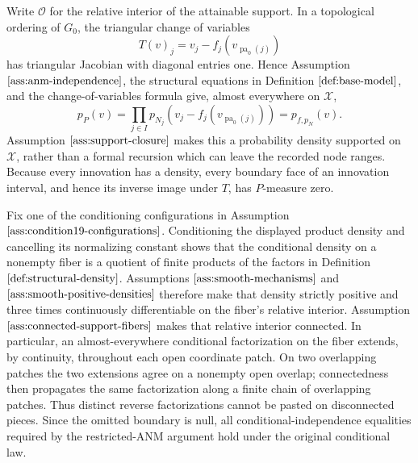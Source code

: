 Write \(\mathcal O\) for the relative interior of the attainable support.  In a topological ordering of \(G_0\), the triangular change of variables
\[
 T(v)_j=v_j-f_j(v_{\operatorname{pa}_0(j)})
\]
has triangular Jacobian with diagonal entries one.  Hence Assumption \(\ref{ass:anm-independence}\), the structural equations in Definition \(\ref{def:base-model}\), and the change-of-variables formula give, almost everywhere on \(\mathcal X\),
\[
 p_P(v)=\prod_{j\in I}p_{N_j}\!\left(v_j-f_j(v_{\operatorname{pa}_0(j)})\right)
 =p_{f,p_N}(v).
\]
Assumption \(\ref{ass:support-closure}\) makes this a probability density supported on \(\mathcal X\), rather than a formal recursion which can leave the recorded node ranges.  Because every innovation has a density, every boundary face of an innovation interval, and hence its inverse image under \(T\), has \(P\)-measure zero.

Fix one of the conditioning configurations in Assumption \(\ref{ass:condition19-configurations}\).  Conditioning the displayed product density and cancelling its normalizing constant shows that the conditional density on a nonempty fiber is a quotient of finite products of the factors in Definition \(\ref{def:structural-density}\).  Assumptions \(\ref{ass:smooth-mechanisms}\) and \(\ref{ass:smooth-positive-densities}\) therefore make that density strictly positive and three times continuously differentiable on the fiber's relative interior.  Assumption \(\ref{ass:connected-support-fibers}\) makes that relative interior connected.  In particular, an almost-everywhere conditional factorization on the fiber extends, by continuity, throughout each open coordinate patch.  On two overlapping patches the two extensions agree on a nonempty open overlap; connectedness then propagates the same factorization along a finite chain of overlapping patches.  Thus distinct reverse factorizations cannot be pasted on disconnected pieces.  Since the omitted boundary is null, all conditional-independence equalities required by the restricted-ANM argument hold under the original conditional law.

